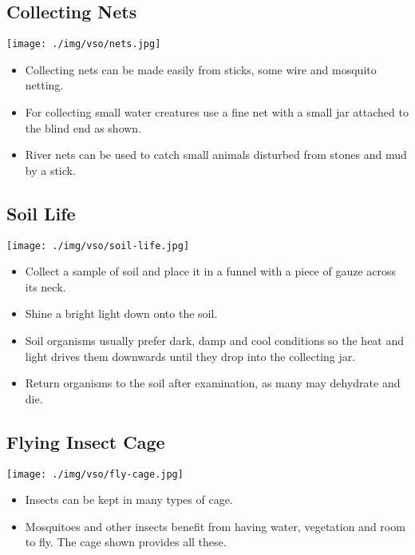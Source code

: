 \begin{multicols}{2}
\subsection{Collecting Nets}

\begin{center}
\texttt{[image: ./img/vso/nets.jpg]}
\end{center}

\begin{itemize}
\item Collecting nets can be made easily from sticks, some wire and
mosquito netting.
\item For collecting small water creatures use a fine net with a small jar
attached to the blind end as shown.
\item River nets can be used to catch small animals disturbed from stones
and mud by a stick.
\end{itemize}


\subsection{Soil Life}

\begin{center}
\texttt{[image: ./img/vso/soil-life.jpg]}
\end{center}

\begin{itemize}
\item Collect a sample of soil and
place it in a funnel with a piece
of gauze across its neck.
\item Shine a bright light down onto
the soil.
\item Soil organisms usually prefer
dark, damp and cool conditions
so the heat and light drives
them downwards until they
drop into the collecting jar.
\item Return organisms to the soil
after examination, as many may
dehydrate and die.
\end{itemize}


\subsection{Flying Insect Cage}

\begin{center}
\texttt{[image: ./img/vso/fly-cage.jpg]}
\end{center}

\begin{itemize}
\item Insects can be kept in many
types of cage.
\item Mosquitoes and other insects
benefit from having water,
vegetation and room to fly. The
cage shown provides all these.
\end{itemize}



\end{multicols}
